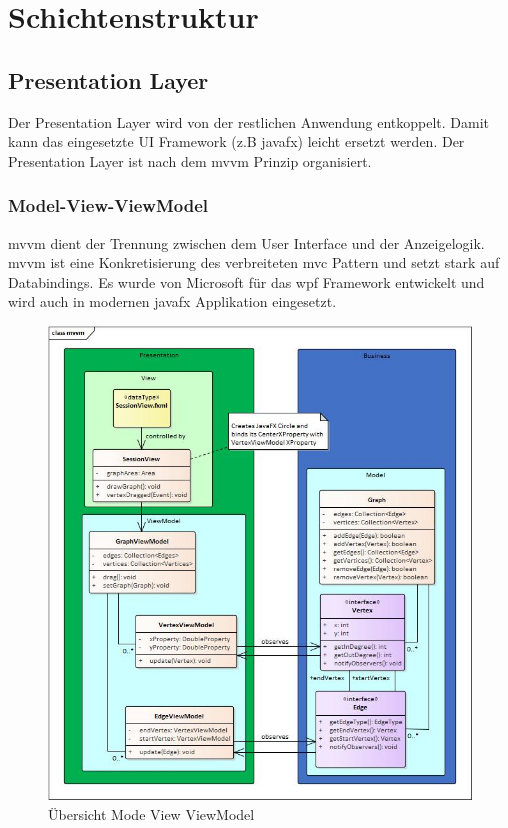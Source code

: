 \documentclass[11pt,a4paper,english,oneside]{book}
\numberwithin{equation}{chapter}
\begin{document}
	
	
	\section{Schichtenstruktur} \label{ssec:layer-architecture}
	
	\subsection{Presentation Layer}
	Der Presentation Layer wird von der restlichen Anwendung entkoppelt. Damit kann das eingesetzte UI Framework (z.B \gls{javafx}) leicht ersetzt werden. Der Presentation Layer ist nach dem \gls{mvvm} Prinzip organisiert.
	
	\subsubsection{Model-View-ViewModel} \label{sssec:mvvm}
	\gls{mvvm} dient der Trennung zwischen dem User Interface und der Anzeigelogik. \gls{mvvm} ist eine Konkretisierung des verbreiteten \gls{mvc} Pattern und setzt stark auf Databindings. Es wurde von Microsoft für das \gls{wpf} Framework entwickelt und wird auch in modernen \gls{javafx} Applikation eingesetzt.
	
	\begin{figure}[h!]
		\centering
		\includegraphics[width=0.7\linewidth]{assets/images/mvvm_concept}
		\caption[MVVM Konzept]{Übersicht Mode View ViewModel}
		\label{fig:mvvmconcept}
	\end{figure}
	
\end{document}
